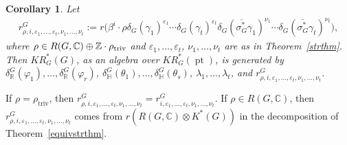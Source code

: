 \documentclass[pdftex]{sigma}
\numberwithin{equation}{section}
\newtheorem{Corollary}[Theorem]{Corollary}
\DeclareMathOperator{\pt}{pt}
\begin{document}
\begin{Corollary}
\label{eqmodgenerators}
Let
\begin{gather*}
r^G_{\rho, i, \varepsilon_1, \dots, \varepsilon_t, \nu_1, \dots,\nu_t}
:=r\big(\beta^i\cdot\rho\delta_G(\gamma_1)^{\varepsilon_1}\cdots\delta_G(\gamma_t)^{\varepsilon_t}\delta_G(\overline{\sigma_G^*}
\gamma_1)^{\nu_1}\cdots\delta_G(\overline{\sigma_G^*}
\gamma_t)^{\nu_t}\big),
\end{gather*}
where $\rho\in R(G, \mathbb{C})\oplus \mathbb{Z}\cdot\rho_{\text{\rm triv}}$ and $\varepsilon_1, \dots, \varepsilon_t$,
$\nu_1, \dots, \nu_t$ are as in Theorem~{\rm \ref{strthm}}.
Then $KR_G^*(G)$, as an algebra over $KR_G^*(\pt)$, is generated by $\delta_\mathbb{R}^G(\varphi_1), \dots,
\delta_\mathbb{R}^G(\varphi_r)$, $\delta_\mathbb{H}^G(\theta_1), \dots, \delta_\mathbb{H}^G(\theta_s)$, $\lambda_1, \dots,
\lambda_t$, and $r^G_{\rho, i, \varepsilon_1, \dots, \varepsilon_t, \nu_1, \dots, \nu_t}$.
\end{Corollary}
\begin{Remark}
If $\rho=\rho_{\text{triv}}$, then $r^G_{\rho, i, \varepsilon_1, \dots, \varepsilon_t, \nu_1, \dots, \nu_t}=r^G_{i,
\varepsilon_1, \dots, \varepsilon_t, \nu_1, \dots, \nu_t}$.
If $\rho\in R(G, \mathbb{C})$, then $r^G_{\rho, i, \varepsilon_1, \dots, \varepsilon_t, \nu_1, \dots, \nu_t}$ comes from
$r(R(G, \mathbb{C})\otimes K^*(G))$ in the decomposition of Theorem~\ref{equivstrthm}.
\end{Remark}
\end{document}
